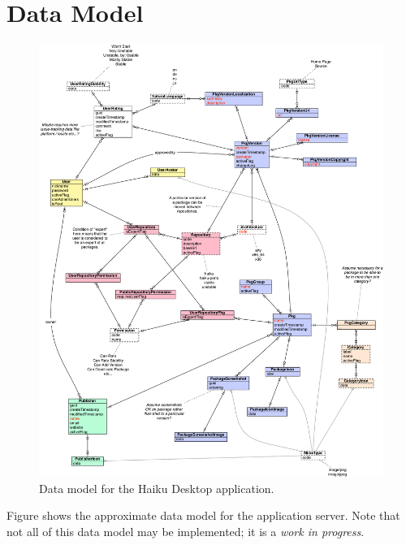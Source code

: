 \section{Data Model}

\begin{figure}
\centering
\vspace{.2in}
\includegraphics[width=6.5in]{img-datamodel.pdf}
\caption{Data model for the Haiku Desktop application.}
\label{\thefigure}
\end{figure}

Figure {\thefigure} shows the approximate data model for the application server.  Note that not all of this data model may be implemented; it is a {\it work in progress}.